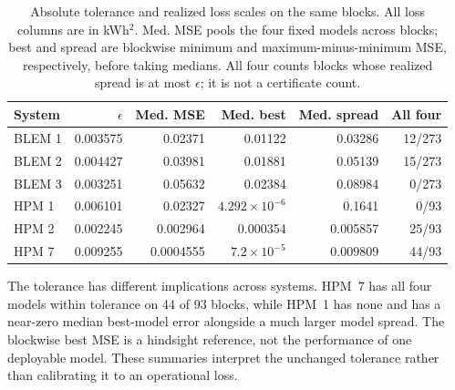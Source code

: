 \begin{table}[htbp]\centering\small
\caption{Absolute tolerance and realized loss scales on the same blocks. All loss columns are in kWh$^2$. Med. MSE pools the four fixed models across blocks; best and spread are blockwise minimum and maximum-minus-minimum MSE, respectively, before taking medians. All four counts blocks whose realized spread is at most $\epsilon$; it is not a certificate count.}
\label{tab:retrieval-tolerance-scale}
\begin{tabular}{lrrrrr}\toprule
System & $\epsilon$ & Med. MSE & Med. best & Med. spread & All four\\\midrule
BLEM 1 & 0.003575 & 0.02371 & 0.01122 & 0.03286 & 12/273\\
BLEM 2 & 0.004427 & 0.03981 & 0.01881 & 0.05139 & 15/273\\
BLEM 3 & 0.003251 & 0.05632 & 0.02384 & 0.08984 & 0/273\\
HPM 1 & 0.006101 & 0.02327 & $4.292\times10^{-6}$ & 0.1641 & 0/93\\
HPM 2 & 0.002245 & 0.002964 & 0.000354 & 0.005857 & 25/93\\
HPM 7 & 0.009255 & 0.0004555 & $7.2\times10^{-5}$ & 0.009809 & 44/93\\
\bottomrule\end{tabular}\end{table}
The tolerance has different implications across systems. HPM~7 has all four models within tolerance on 44 of 93 blocks, while HPM~1 has none and has a near-zero median best-model error alongside a much larger model spread. The blockwise best MSE is a hindsight reference, not the performance of one deployable model. These summaries interpret the unchanged tolerance rather than calibrating it to an operational loss.
